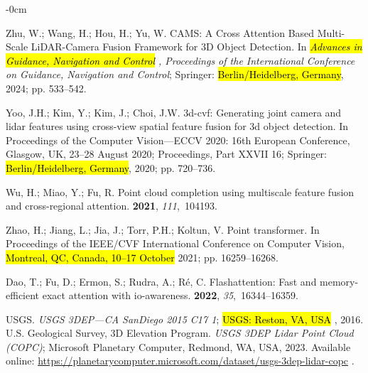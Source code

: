 \documentclass[remotesensing,article,accept,pdftex,moreauthors]{Definitions/mdpi}
\begin{document}
\begin{adjustwidth}{-\extralength}{0cm}
\begin{thebibliography}{999}
Zhu, W.; Wang, H.; Hou, H.; Yu, W.
\newblock CAMS: A Cross Attention Based Multi-Scale LiDAR-Camera Fusion
  Framework for 3D Object Detection.
\newblock In \emph{\hl{Advances in Guidance, Navigation and Control}%
, Proceedings of the International Conference on Guidance,
  Navigation and Control}; Springer: \hl{Berlin/Heidelberg, Germany}, 2024; pp. 533--542.

Yoo, J.H.; Kim, Y.; Kim, J.; Choi, J.W.
\newblock 3d-cvf: Generating joint camera and lidar features using cross-view
  spatial feature fusion for 3d object detection.
\newblock In Proceedings of the Computer Vision---ECCV 2020: 16th European  Conference, Glasgow, UK, 23--28 August 2020; Proceedings, Part XXVII 16; Springer: \hl{Berlin/Heidelberg, Germany}, 2020; pp. 720--736.

Wu, H.; Miao, Y.; Fu, R.
\newblock Point cloud completion using multiscale feature fusion and
  cross-regional attention.
 {\bf 2021}, {\em 111},~104193.

Zhao, H.; Jiang, L.; Jia, J.; Torr, P.H.; Koltun, V.
\newblock Point transformer.
\newblock In Proceedings of the IEEE/CVF International
  Conference on Computer Vision, \hl{Montreal, QC, Canada, 10--17 October} 2021; pp. 16259--16268.

Dao, T.; Fu, D.; Ermon, S.; Rudra, A.; R{\'e}, C.
\newblock Flashattention: Fast and memory-efficient exact attention with
  io-awareness.
 {\bf 2022},
  {\em 35},~16344--16359.

{USGS}.
\newblock \emph{{USGS} 3DEP---{CA} {SanDiego} 2015 C17 1}; \hl{USGS: Reston, VA, USA}%
, 2016.
{U.S. Geological Survey, 3D Elevation Program}.
\newblock \emph{USGS 3DEP Lidar Point Cloud (COPC)};
\newblock Microsoft Planetary Computer, Redmond, WA, USA, 2023. Available online: \url{https://planetarycomputer.microsoft.com/dataset/usgs-3dep-lidar-copc}
.


\end{thebibliography}
\end{adjustwidth}
\end{document}
